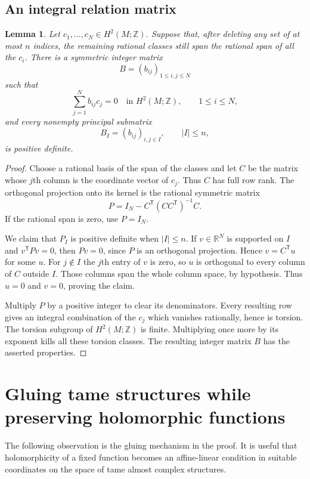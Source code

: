 \documentclass[11pt]{article}
\newtheorem{lemma}[theorem]{Lemma}
\theoremstyle{definition}
\theoremstyle{remark}
\newcommand{\R}{\mathbb R}
\newcommand{\Z}{\mathbb Z}
\begin{document}
\subsection{An integral relation matrix}

\begin{lemma}\label{lem:matrix}
Let $c_1,\ldots,c_N\in H^2(M;\Z)$.  Suppose that, after deleting
any set of at most $n$ indices, the remaining rational classes
still span the rational span of all the $c_i$.
There is a symmetric integer matrix
\[
B=(b_{ij})_{1\leq i,j\leq N}
\]
such that
\[
\sum_{j=1}^{N}b_{ij}c_j=0
\quad\text{in }H^2(M;\Z),\qquad 1\leq i\leq N,
\]
and every nonempty principal submatrix
\[
B_I=(b_{ij})_{i,j\in I},\qquad |I|\leq n,
\]
is positive definite.
\end{lemma}

\begin{proof}
Choose a rational basis of the span of the classes and let $C$
be the matrix whose $j$th column is the coordinate vector of
$c_j$.  Thus $C$ has full row rank.  The orthogonal projection
onto its kernel is the rational symmetric matrix
\[
P=I_N-C^{\mathsf T}(CC^{\mathsf T})^{-1}C.
\]
If the rational span is zero, use $P=I_N$.

We claim that $P_I$ is positive definite when $|I|\leq n$.
If $v\in\R^N$ is supported on $I$ and
$v^{\mathsf T}Pv=0$, then $Pv=0$, since $P$ is an orthogonal
projection.  Hence $v=C^{\mathsf T}u$ for some $u$.
For $j\notin I$ the $j$th entry of $v$ is zero, so $u$ is
orthogonal to every column of $C$ outside $I$.  Those columns
span the whole column space, by hypothesis.  Thus $u=0$ and
$v=0$, proving the claim.

Multiply $P$ by a positive integer to clear its denominators.
Every resulting row gives an integral combination of the $c_j$
which vanishes rationally, hence is torsion.  The torsion
subgroup of $H^2(M;\Z)$ is finite.  Multiplying once more by
its exponent kills all these torsion classes.  The resulting
integer matrix $B$ has the asserted properties.
\end{proof}

\section{Gluing tame structures while preserving holomorphic functions}

The following observation is the gluing mechanism in the proof.
It is useful that holomorphicity of a fixed function becomes an
affine-linear condition in suitable coordinates on the space of
tame almost complex structures.
\end{document}
